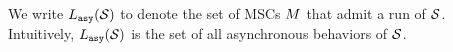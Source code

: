 We write $L_{\mathtt{asy}}(\mathcal{S})$ to denote the set of MSCs $M$ that admit a run of $\mathcal{S}$.
Intuitively, $L_{\mathtt{asy}}(\mathcal{S})$ is the set of all asynchronous behaviors of $\mathcal{S}$.

%



